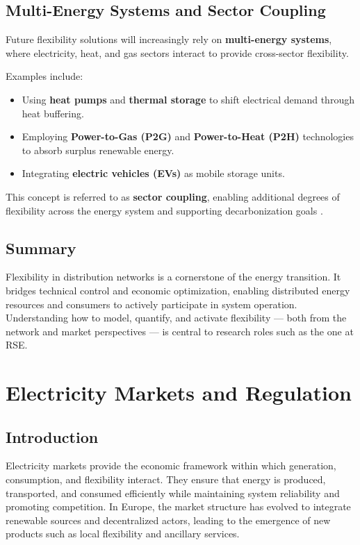 \documentclass[11pt]{article}
\begin{document}
	\subsection{Multi-Energy Systems and Sector Coupling}
	
	Future flexibility solutions will increasingly rely on \textbf{multi-energy systems}, where electricity, heat, and gas sectors interact to provide cross-sector flexibility.
	
	Examples include:
	\begin{itemize}
		\item Using \textbf{heat pumps} and \textbf{thermal storage} to shift electrical demand through heat buffering.
		\item Employing \textbf{Power-to-Gas (P2G)} and \textbf{Power-to-Heat (P2H)} technologies to absorb surplus renewable energy.
		\item Integrating \textbf{electric vehicles (EVs)} as mobile storage units.
	\end{itemize}
	
	This concept is referred to as \textbf{sector coupling}, enabling additional degrees of flexibility across the energy system and supporting decarbonization goals \cite{IEA_sectorcoupling2021}.
	
	\subsection*{Summary}
	
	Flexibility in distribution networks is a cornerstone of the energy transition.  
	It bridges technical control and economic optimization, enabling distributed energy resources and consumers to actively participate in system operation.  
	Understanding how to model, quantify, and activate flexibility — both from the network and market perspectives — is central to research roles such as the one at RSE.
	
	
	\section{Electricity Markets and Regulation}
	
	\subsection{Introduction}
	
	Electricity markets provide the economic framework within which generation, consumption, and flexibility interact.  
	They ensure that energy is produced, transported, and consumed efficiently while maintaining system reliability and promoting competition.  
	In Europe, the market structure has evolved to integrate renewable sources and decentralized actors, leading to the emergence of new products such as local flexibility and ancillary services.
	
\end{document}
